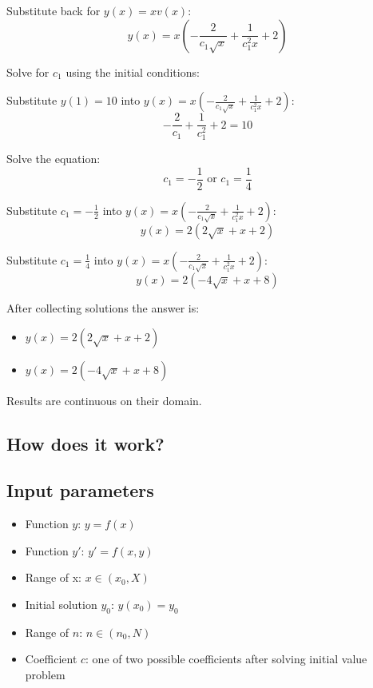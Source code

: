 \documentclass[12pt,letterpaper]{article}
\begin{document}
Substitute back for $y(x) = x v(x)$:
\begin{equation}
     y(x) = x(- \frac{2}{c_1\sqrt{x}} + \frac{1}{c_1^2x} + 2)
\end{equation}

Solve for $c_1$ using the initial conditions:

Substitute $y(1) = 10$ into $y(x) = x(- \frac{2}{c_1\sqrt{x}} + \frac{1}{c_1^2x} + 2)$:
\begin{equation}
     -\frac{2}{c_1} + \frac{1}{c_1^2} + 2 = 10
\end{equation}

Solve the equation:
\begin{equation}
     c_1 = -\frac{1}{2} \text{ or } c_1 = \frac{1}{4}
\end{equation}

Substitute $c_1 = -\frac{1}{2}$ into $y(x) = x(- \frac{2}{c_1\sqrt{x}} + \frac{1}{c_1^2x} + 2)$:
\begin{equation}
     y(x) = 2 (2 \sqrt{x} + x + 2)
\end{equation}

Substitute $c_1 = \frac{1}{4}$ into $y(x) = x(- \frac{2}{c_1\sqrt{x}} + \frac{1}{c_1^2x} + 2)$:
\begin{equation}
     y(x) = 2 (-4 \sqrt{x} + x + 8)
\end{equation}

After collecting solutions the answer is:
\begin{itemize}
    \item
         $y(x) = 2 (2 \sqrt{x} + x + 2)$
    \item
         $y(x) = 2 (-4 \sqrt{x} + x + 8)$
\end{itemize}
Results are continuous on their domain.

\begin{center}
    \section*{How does it work?}
    \subsection*{Input parameters}
\end{center}


\begin{itemize}
    \item
         Function $y$: $y = f(x)$
    \item
         Function $y'$: $y' = f(x,y)$
    \item
         Range of x: $x \in (x_0, X)$
    \item
         Initial solution $y_0$: $y(x_0) = y_0$
    \item
         Range of $n$: $n \in (n_0, N)$
    \item
         Coefficient $c$: one of two possible coefficients after solving initial value problem
\end{itemize}
\end{document}
